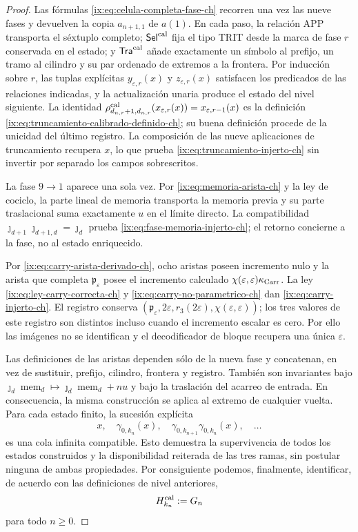 \begin{proof}
Las fórmulas \eqref{ix:eq:celula-completa-fase-ch} recorren una vez las nueve
fases y devuelven la copia \(a_{n+1,1}\) de \(a(1)\). En cada paso, la relación APP transporta el
séxtuplo completo; \(\mathsf{Sel}^{\rm cal}\) fija el tipo TRIT desde la marca de fase
\(r\) conservada en el estado;
y \(\mathsf{Tra}^{\rm cal}\) añade exactamente un símbolo al prefijo, un tramo al
cilindro y su par ordenado de extremos a la frontera. Por inducción sobre
\(r\), las tuplas explícitas \(y_{\varepsilon,r}(x)\) y
\(z_{\varepsilon,r}(x)\) satisfacen los predicados de las relaciones
indicadas, y la actualización unaria produce el estado del nivel siguiente.
La identidad
\(\rho^{\rm cal}_{d_{n,r}+1,d_{n,r}}
(x_{\varepsilon,r}(x))=x_{\varepsilon,r-1}(x)\) es la definición
\eqref{ix:eq:truncamiento-calibrado-definido-ch}; su buena definición procede de
la unicidad del último registro. La composición de las nueve aplicaciones de
truncamiento recupera \(x\), lo que prueba
\eqref{ix:eq:truncamiento-injerto-ch} sin invertir por separado los campos
sobrescritos.

La fase \(9\to1\) aparece una sola vez. Por
\eqref{ix:eq:memoria-arista-ch} y la ley de cociclo, la parte lineal de memoria
transporta la memoria previa y su parte traslacional suma exactamente \(u\)
en el límite directo. La compatibilidad
\(\jmath_{d+1}\jmath_{d+1,d}=\jmath_d\) prueba
\eqref{ix:eq:fase-memoria-injerto-ch}; el retorno concierne a la fase, no al
estado enriquecido.

Por \eqref{ix:eq:carry-arista-derivado-ch}, ocho aristas poseen incremento nulo y
la arista que completa \(\mathfrak p_\varepsilon\) posee el incremento calculado
\(\chi(\varepsilon,\varepsilon)\kappa_{\rm Carr}\). La ley
\eqref{ix:eq:ley-carry-correcta-ch} y
\eqref{ix:eq:carry-no-parametrico-ch} dan
\eqref{ix:eq:carry-injerto-ch}. El registro conserva
\((\mathfrak p_\varepsilon,2\varepsilon,r_3(2\varepsilon),
\chi(\varepsilon,\varepsilon))\); los tres valores de este registro son
distintos incluso cuando el incremento escalar es cero. Por ello las imágenes
no se identifican y el decodificador de bloque recupera una única
\(\varepsilon\).

Las definiciones de las aristas dependen sólo de la nueva fase y concatenan,
en vez de sustituir, prefijo, cilindro, frontera y registro. También son
invariantes bajo
\(\jmath_d\operatorname{mem}_d\mapsto
  \jmath_d\operatorname{mem}_d+nu\)
y bajo la traslación del acarreo de
entrada. En consecuencia, la misma construcción se aplica al extremo de
cualquier vuelta. Para cada estado finito, la sucesión explícita
\[
 x,\quad\gamma_{0,k_n}(x),\quad
 \gamma_{0,k_{n+1}}\gamma_{0,k_n}(x),\quad\ldots
\]
es una cola infinita compatible. Esto demuestra la supervivencia de todos los
estados construidos y la disponibilidad reiterada de las tres ramas, sin
postular ninguna de ambas propiedades. Por consiguiente podemos, finalmente,
identificar, de acuerdo con las definiciones de nivel anteriores,
\begin{equation}
 H_{k_n}^{\rm cal}:=G_n
 \label{ix:eq:subarbol-calibrado-superviviente-ch}
\end{equation}
para todo \(n\ge0\).
\end{proof}

